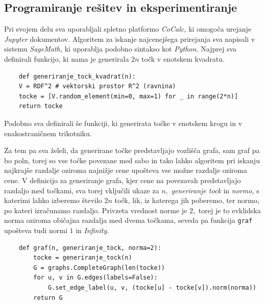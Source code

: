 \documentclass[a4paper, 11pt]{article}
\begin{document}
\subsection{Programiranje rešitev in eksperimentiranje}
Pri svojem delu sva uporabljali spletno platformo \emph{CoCalc,} ki omogoča urejanje \emph{Jupyter} dokumentov.
Algoritem za iskanje najcenejšega prirejanja sva napisali v sistemu \emph{SageMath,} ki uporablja podobno sintakso kot \emph{Python.}
Najprej sva definirali funkcijo, ki nama je generirala $2n$ točk v enotskem kvadratu.

\begin{verbatim}
    def generiranje_tock_kvadrat(n):
    V = RDF^2 # vektorski prostor R^2 (ravnina)
    tocke = [V.random_element(min=0, max=1) for _ in range(2*n)]
    return tocke 
\end{verbatim}

Podobno sva definirali še funkciji, ki generirata točke v enotskem krogu in v enakostraničnem trikotniku.

Za tem pa sva želeli, da generirane točke predstavljajo vozlišča grafa, sam graf pa bo poln, torej so vse točke povezane med sabo
in tako lahko algoritem pri iskanju najkrajše razdalje oziroma najnižje cene upošteva vse možne razdalje oziroma cene.
V definicijo za generiranje grafa, kjer cene na povezavah predstavljajo razdaljo med točkami, sva torej vključili ukaze za $n,$ \emph{generiranje tock} in \emph{normo,}
s katerimi lahko izberemo število $2n$ točk, lik, iz katerega jih poberemo, ter normo, po kateri izračunamo razdaljo. 
Privzeta vrednost norme je $2,$ torej je to evklidska norma oziroma običajna razdalja med dvema točkama, seveda pa funkcija \texttt{graf} upošteva tudi normi $1$ in \emph{Infinity.}

\begin{verbatim}
    def graf(n, generiranje_tock, norma=2):
        tocke = generiranje_tock(n)
        G = graphs.CompleteGraph(len(tocke))
        for u, v in G.edges(labels=False):
            G.set_edge_label(u, v, (tocke[u] - tocke[v]).norm(norma))
        return G
\end{verbatim}
\end{document}
